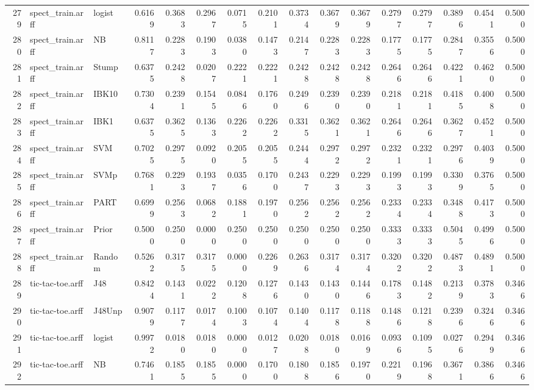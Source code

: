\documentclass {article}
\begin{document}
\begin{table}[ht]
\begin{tabular}{rllrrrrrrrrrrrrr}
  279 & spect\_train.arff & logist & 0.6169 & 0.3683 & 0.2967 & 0.0715 & 0.2101 & 0.3734 & 0.3679 & 0.3679 & 0.2797 & 0.2797 & 0.3896 & 0.4541 & 0.5000 \\ 
  280 & spect\_train.arff & NB & 0.8117 & 0.2283 & 0.1903 & 0.0380 & 0.1473 & 0.2147 & 0.2283 & 0.2283 & 0.1775 & 0.1775 & 0.2847 & 0.3556 & 0.5000 \\ 
  281 & spect\_train.arff & Stump & 0.6375 & 0.2428 & 0.0207 & 0.2221 & 0.2221 & 0.2428 & 0.2428 & 0.2428 & 0.2646 & 0.2646 & 0.4221 & 0.4620 & 0.5000 \\ 
  282 & spect\_train.arff & IBK10 & 0.7304 & 0.2391 & 0.1545 & 0.0846 & 0.1760 & 0.2496 & 0.2390 & 0.2390 & 0.2181 & 0.2181 & 0.4185 & 0.4008 & 0.5000 \\ 
  283 & spect\_train.arff & IBK1 & 0.6375 & 0.3625 & 0.1363 & 0.2262 & 0.2262 & 0.3315 & 0.3621 & 0.3621 & 0.2646 & 0.2646 & 0.3627 & 0.4521 & 0.5000 \\ 
  284 & spect\_train.arff & SVM & 0.7025 & 0.2975 & 0.0920 & 0.2055 & 0.2055 & 0.2444 & 0.2972 & 0.2972 & 0.2321 & 0.2321 & 0.2976 & 0.4039 & 0.5000 \\ 
  285 & spect\_train.arff & SVMp & 0.7681 & 0.2293 & 0.1937 & 0.0356 & 0.1700 & 0.2437 & 0.2293 & 0.2293 & 0.1993 & 0.1993 & 0.3309 & 0.3765 & 0.5000 \\ 
  286 & spect\_train.arff & PART & 0.6999 & 0.2563 & 0.0682 & 0.1881 & 0.1970 & 0.2562 & 0.2562 & 0.2562 & 0.2334 & 0.2334 & 0.3488 & 0.4173 & 0.5000 \\ 
  287 & spect\_train.arff & Prior & 0.5000 & 0.2500 & 0.0000 & 0.2500 & 0.2500 & 0.2500 & 0.2500 & 0.2500 & 0.3333 & 0.3333 & 0.5045 & 0.4996 & 0.5000 \\ 
  288 & spect\_train.arff & Random & 0.5262 & 0.3175 & 0.3175 & 0.0000 & 0.2269 & 0.2636 & 0.3174 & 0.3174 & 0.3202 & 0.3202 & 0.4873 & 0.4891 & 0.5000 \\ 
  289 & tic-tac-toe.arff & J48 & 0.8424 & 0.1431 & 0.0222 & 0.1208 & 0.1276 & 0.1430 & 0.1430 & 0.1446 & 0.1783 & 0.1482 & 0.2139 & 0.3783 & 0.3466 \\ 
  290 & tic-tac-toe.arff & J48Unp & 0.9079 & 0.1177 & 0.0174 & 0.1003 & 0.1074 & 0.1404 & 0.1178 & 0.1188 & 0.1486 & 0.1218 & 0.2396 & 0.3246 & 0.3466 \\ 
  291 & tic-tac-toe.arff & logist & 0.9972 & 0.0180 & 0.0180 & 0.0000 & 0.0127 & 0.0208 & 0.0180 & 0.0169 & 0.0936 & 0.1095 & 0.0276 & 0.2949 & 0.3466 \\ 
  292 & tic-tac-toe.arff & NB & 0.7461 & 0.1855 & 0.1855 & 0.0000 & 0.1700 & 0.1808 & 0.1856 & 0.1970 & 0.2219 & 0.1968 & 0.3671 & 0.3866 & 0.3466 \\ 

\end{tabular}
\end{table}
\end{document}
